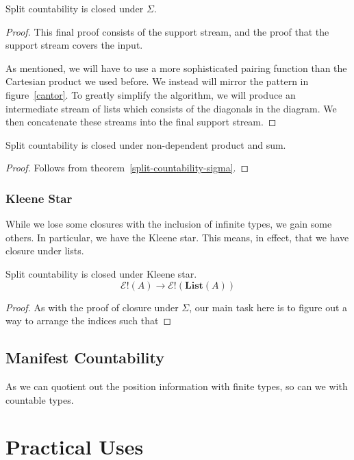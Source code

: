 \begin{rm-theorem} \label{split-countability-sigma}
  Split countability is closed under \(\Sigma\).
\end{rm-theorem}
\begin{proof}
  This final proof consists of the support stream, and the proof that the
  support stream covers the input.

  As mentioned, we will have to use a more sophisticated pairing function than
  the Cartesian product we used before.
  We instead will mirror the pattern in figure~\ref{cantor}.
  To greatly simplify the algorithm, we will produce an intermediate stream of
  lists which consists of the diagonals in the diagram.
  We then concatenate these streams into the final support stream.
\end{proof}
\begin{rm-lemma}
  Split countability is closed under non-dependent product and sum.
\end{rm-lemma}
\begin{proof}
  Follows from theorem~\ref{split-countability-sigma}.
\end{proof}
\subsubsection{Kleene Star}
While we lose some closures with the inclusion of infinite types, we gain some
others.
In particular, we have the Kleene star.
This means, in effect, that we have closure under lists.
\begin{rm-theorem}
  Split countability is closed under Kleene star.
  \begin{equation}
    \mathcal{E}!(A) \rightarrow \mathcal{E}!(\mathbf{List}(A))
  \end{equation}
\end{rm-theorem}
\begin{proof}
  As with the proof of closure under \(\Sigma\), our main task here is to figure
  out a way to arrange the indices such that 
\end{proof}
\subsection{Manifest Countability}
As we can quotient out the position information with finite types, so can we with
countable types.
\section{Practical Uses} \label{practical}
